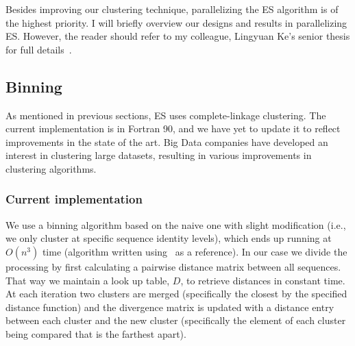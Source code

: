 Besides improving our clustering technique, parallelizing the ES algorithm is of the highest priority.
I will briefly overview our designs and results in parallelizing ES.
However, the reader should refer to my colleague, Lingyuan Ke's senior thesis for full details~\cite{lingThesis}.
\subsection*{Binning}
As mentioned in previous sections, ES uses complete-linkage clustering.
The current implementation is in Fortran 90, and we have yet to update it to reflect improvements in the state of the art.
Big Data companies have developed an interest in clustering large datasets, resulting in various improvements in clustering algorithms.
\subsubsection*{Current implementation}
We use a binning algorithm based on the naive one
with slight modification (i.e., we only cluster at specific sequence identity levels), which ends up running at $O(n^3)$ time (algorithm written using~\cite{FastClust} as a reference).
In our case we divide the processing by first calculating a pairwise distance matrix between all sequences.
That way we maintain a look up table, $D$, to retrieve distances in constant time.
At each iteration two clusters are merged (specifically the closest by the specified distance function) and the divergence matrix is updated with a distance entry between each cluster and the new cluster (specifically the element of each cluster being compared that is the farthest apart).

